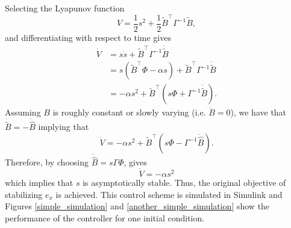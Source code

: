 Selecting the Lyapunov function
\begin{equation}
V=\frac{1}{2}s^2+\frac{1}{2}\tilde{B}^\top \Gamma^{-1}\tilde{B},
\label{v}
\end{equation}
and differentiating with respect to time gives
\begin{align}
\dot{V}&=s\dot{s}+\tilde{B}^\top \Gamma^{-1}\dot{\tilde{B}}
\\&=s(\tilde{B}^\top\Phi-\alpha s)+\tilde{B}^\top \Gamma^{-1}\dot{\tilde{B}}
\\&=-\alpha s^2+\tilde{B}^\top(s\Phi+\Gamma^{-1}\dot{\tilde{B}}).
\label{vdot}
\end{align}
Assuming $B$ is roughly constant or slowly varying (i.e. $\dot{B}=0$), we have that $\dot{\tilde{B}}=-\dot{\hat{B}}$ implying that
\begin{equation}
\dot{V}=-\alpha s^2+\tilde{B}^\top(s\Phi-\Gamma^{-1}\dot{\hat{B}}).
\end{equation}
Therefore, by choosing $\dot{\hat{B}}=s\Gamma\Phi$, gives
\begin{equation}
\dot{V}=-\alpha s^2
\end{equation}
which implies that $s$ is asymptotically stable. Thus, the original objective of stabilizing $e_x$ is achieved. This control scheme is simulated in Simulink and Figures \ref{simple_simulation} and \ref{another_simple_simulation} show the performance of the controller for one initial condition. 
